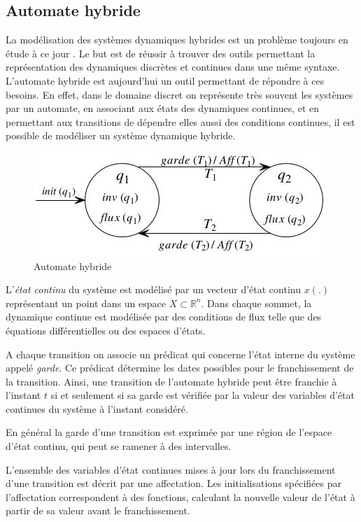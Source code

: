\subsection{Automate hybride}
La modélisation des systèmes dynamiques hybrides est un problème toujours en étude à ce jour \cite{goebel_hybrid_2012}. Le but est de réussir à trouver des outils permettant la représentation des dynamiques discrètes et continues dans une même syntaxe. L'automate hybride \cite{henzinger_theory_2000} est aujourd'hui un outil permettant de répondre à ces besoins. En effet, dans le domaine discret on représente très souvent les systèmes par un automate, en associant aux états des dynamiques continues, et en permettant aux transitions de dépendre elles aussi des conditions continues, il est possible de modéliser un système dynamique hybride.

\begin{figure}[h]
	\centering	
	\includegraphics{images/automateHybride.jpeg}
	\caption{Automate hybride}
	\label{exempleAutomateHybride}
\end{figure}

L'\textit{état continu} du système est modélisé par un vecteur d'état continu $x(.)$ représentant un point dans un espace $X \subset \mathbb{R}^n$. Dans chaque sommet, la dynamique continue est modélisée par des conditions de flux telle que des équations différentielles ou des espaces d'états.

A chaque transition on associe un prédicat qui concerne l'état interne du système appelé \textit{garde}. Ce prédicat détermine les dates possibles pour le franchissement de la transition. Ainsi, une transition de l'automate hybride peut être franchie à l'instant $t$ si et seulement si sa garde est vérifiée par la valeur des variables d'état continues du système à l'instant considéré.

En général la garde d'une transition est exprimée par une région de l'espace d'état continu, qui peut se ramener à des intervalles.

L'ensemble des variables d'état continues mises à jour lors du franchissement d'une transition est décrit par une affectation. Les initialisations spécifiées par l'affectation correspondent à des fonctions, calculant la nouvelle valeur de l'état à partir de sa valeur avant le franchissement.

